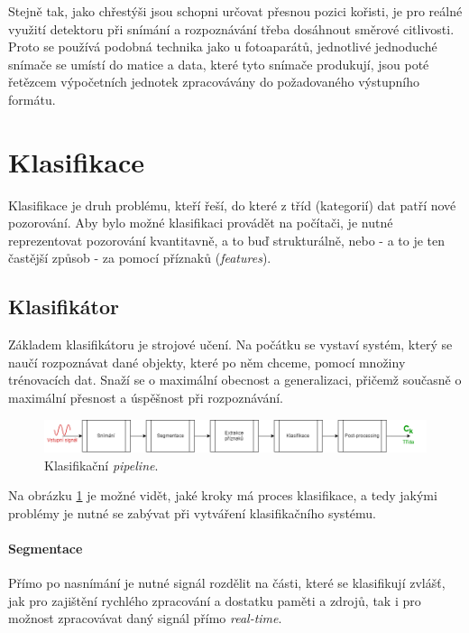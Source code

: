 \documentclass[10pt,a4paper,titlepage]{article}
\begin{document}
  Stejně tak, jako chřestýši jsou schopni určovat přesnou pozici kořisti, je pro reálné využití detektoru
  při snímání a rozpoznávání třeba dosáhnout směrové citlivosti. Proto se používá podobná technika jako
  u fotoaparátů, jednotlivé jednoduché snímače se umístí do matice a data, které tyto snímače produkují,
  jsou poté řetězcem výpočetních jednotek zpracovávány do požadovaného výstupního formátu.
  
  \section{Klasifikace}
  Klasifikace je druh problému, kteří řeší, do které z tříd (kategorií) dat patří nové pozorování.
  Aby bylo možné klasifikaci provádět na počítači, je nutné reprezentovat pozorování kvantitavně,
  a to buď strukturálně, nebo - a to je ten častější způsob - za pomocí příznaků ({\it features}).

  \subsection{Klasifikátor}
  Základem klasifikátoru je strojové učení. Na počátku se vystaví systém, který se naučí rozpoznávat
  dané objekty, které po něm chceme, pomocí množiny trénovacích dat. Snaží se o maximální obecnost
  a generalizaci, přičemž současně o maximální přesnost a úspěšnost při rozpoznávání.

  \begin{figure}[h!]
    \begin{center}
      \includegraphics[width=1\textwidth]{classification.png}
      \caption[title=Obrazek]{Klasifikační {\it pipeline}.\label{fig:classification}}
    \end{center}    
  \end{figure}

  Na obrázku \ref{fig:classification} je možné vidět, jaké kroky má proces klasifikace, a tedy
  jakými problémy je nutné se zabývat při vytváření klasifikačního systému.
  
  \paragraph{Segmentace}
  Přímo po nasnímání je nutné signál rozdělit na části, které se klasifikují zvlášť, jak pro
  zajištění rychlého zpracování a dostatku paměti a zdrojů, tak i pro možnost zpracovávat
  daný signál přímo {\it real-time}.
\end{document}
